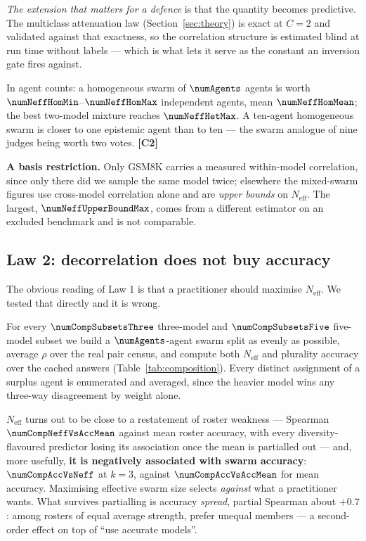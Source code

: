 \emph{The extension that matters for a defence} is that the quantity becomes
predictive. The multiclass attenuation law (Section~\ref{sec:theory}) is exact at
$C=2$ and validated against that exactness, so the correlation structure is
estimated blind at run time without labels --- which is what lets it serve as the
constant an inversion gate fires against.

In agent counts: a homogeneous swarm of $\numAgents$ agents is worth
$\numNeffHomMin$--$\numNeffHomMax$ independent agents, mean $\numNeffHomMean$;
the best two-model mixture reaches $\numNeffHetMax$. A ten-agent homogeneous
swarm is closer to one epistemic agent than to ten --- the swarm analogue of nine
judges being worth two votes. \textbf{[C2]}

\textbf{A basis restriction.} Only GSM8K carries a measured within-model
correlation, since only there did we sample the same model twice; elsewhere the
mixed-swarm figures use cross-model correlation alone and are \emph{upper bounds}
on $N_{\mathrm{eff}}$. The largest, $\numNeffUpperBoundMax$, comes from a
different estimator on an excluded benchmark and is not comparable.

\subsection{Law 2: decorrelation does not buy accuracy}

The obvious reading of Law 1 is that a practitioner should maximise
$N_{\mathrm{eff}}$. We tested that directly and it is wrong.

For every $\numCompSubsetsThree$ three-model and $\numCompSubsetsFive$
five-model subset we build a $\numAgents$-agent swarm split as evenly as
possible, average $\rho$ over the real pair census, and compute both
$N_{\mathrm{eff}}$ and plurality accuracy over the cached answers
(Table~\ref{tab:composition}). Every distinct assignment of a surplus agent is
enumerated and averaged, since the heavier model wins any three-way disagreement
by weight alone.

$N_{\mathrm{eff}}$ turns out to be close to a restatement of roster weakness ---
Spearman $\numCompNeffVsAccMean$ against mean roster accuracy, with every
diversity-flavoured predictor losing its association once the mean is partialled
out --- and, more usefully, \textbf{it is negatively associated with swarm
accuracy}: $\numCompAccVsNeff$ at $k=3$, against $\numCompAccVsAccMean$ for mean
accuracy. Maximising effective swarm size selects \emph{against} what a
practitioner wants. What survives partialling is accuracy \emph{spread}, partial
Spearman about $+0.7$: among rosters of equal average strength, prefer unequal
members --- a second-order effect on top of ``use accurate models''.

